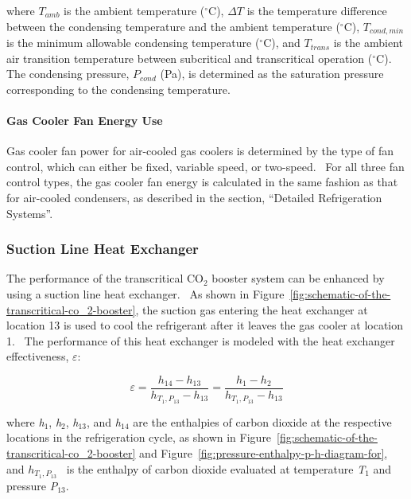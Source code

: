 where \(T_{amb}\) is the ambient temperature (\(^{\circ}\)C), \(\Delta T\) is the temperature difference between the condensing temperature and the ambient temperature (\(^{\circ}\)C), \(T_{cond,min}\) is the minimum allowable condensing temperature (\(^{\circ}\)C), and \(T_{trans}\) is the ambient air transition temperature between subcritical and transcritical operation (\(^{\circ}\)C).~ The condensing pressure, \(P_{cond}\) (Pa), is determined as the saturation pressure corresponding to the condensing temperature.

\paragraph{Gas Cooler Fan Energy Use}\label{gas-cooler-fan-energy-use}

Gas cooler fan power for air-cooled gas coolers is determined by the type of fan control, which can either be fixed, variable speed, or two-speed.~ For all three fan control types, the gas cooler fan energy is calculated in the same fashion as that for air-cooled condensers, as described in the section, ``Detailed Refrigeration Systems''.

\subsubsection{Suction Line Heat Exchanger}\label{suction-line-heat-exchanger}

The performance of the transcritical CO\(_{2}\) booster system can be enhanced by using a suction line heat exchanger.~ As shown in Figure~\ref{fig:schematic-of-the-transcritical-co_2-booster}, the suction gas entering the heat exchanger at location 13 is used to cool the refrigerant after it leaves the gas cooler at location 1.~ The performance of this heat exchanger is modeled with the heat exchanger effectiveness, \(\varepsilon\):

\begin{equation}
\varepsilon  = \frac{{{h_{14}} - {h_{13}}}}{{{h_{{T_1},{P_{13}}}} - {h_{13}}}} = \frac{{{h_1} - {h_2}}}{{{h_{{T_1},{P_{13}}}} - {h_{13}}}}
\end{equation}

where \emph{h}\(_{1}\), \emph{h}\(_{2}\), \emph{h}\(_{13}\), and \emph{h}\(_{14}\) are the enthalpies of carbon dioxide at the respective locations in the refrigeration cycle, as shown in Figure~\ref{fig:schematic-of-the-transcritical-co_2-booster} and Figure~\ref{fig:pressure-enthalpy-p-h-diagram-for}, and \({h_{{T_1},{P_{13}}}}\) ~is the enthalpy of carbon dioxide evaluated at temperature \emph{T}\(_{1}\) and pressure \emph{P}\(_{13}\).

